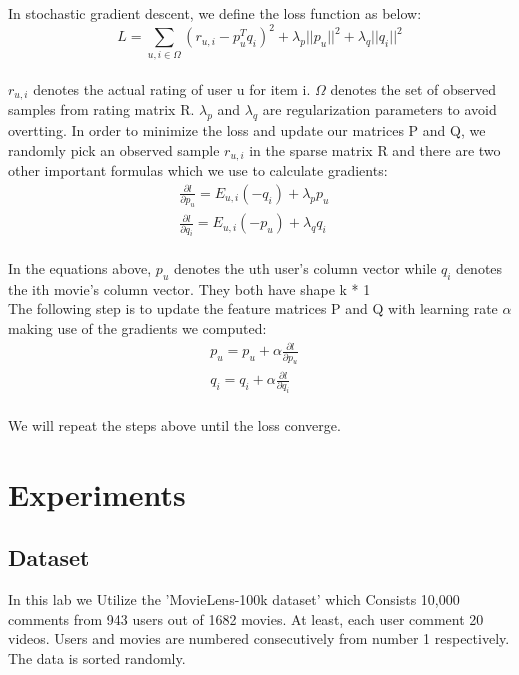 \documentclass[journal, a4paper]{IEEEtran}
\begin{document}
In stochastic gradient descent, we define the loss function as below:
\begin{equation}
    L = \sum_{u,i\in \Omega} (r_{u,i} - p_u^T q_i)^2 + \lambda_p||p_u||^2+\lambda_q||q_i||^2
\end{equation}\\
$r_{u,i}$ denotes the actual rating of user u for item i.
$\Omega$ denotes the set of observed samples from rating matrix R.
$\lambda_p$ and $\lambda_q$ are regularization parameters to avoid overtting.
In order to minimize the loss and update our matrices P and Q, we randomly pick an observed sample $r_{u,i}$ in the sparse matrix R and there are two other important formulas which we use to calculate gradients:
\begin{align}
    \frac{\partial l}{\partial p_u} = E_{u,i}(-q_i)+\lambda_pp_u & \\
    \frac{\partial l}{\partial q_i} = E_{u,i}(-p_u)+\lambda_qq_i
\end{align}\\
In the equations above, $p_u$ denotes the uth user's column vector while $q_i$ denotes the ith movie's column vector. They both have shape k * 1\\
The following step is to update the feature matrices P and Q with learning rate $\alpha$ making use of the gradients we computed:
\begin{align}
    p_u = p_u + \alpha\frac{\partial l}{\partial p_u} & \\
    q_i = q_i + \alpha\frac{\partial l}{\partial q_i}
\end{align}\\
We will repeat the steps above until the loss converge.

\section{Experiments}
\subsection{Dataset}
In this lab we Utilize the 'MovieLens-100k dataset' which Consists 10,000 comments from 943 users out of 1682 movies. At least, each user comment 20 videos. Users and movies are numbered consecutively from number 1 respectively. The data is sorted randomly.
\end{document}
